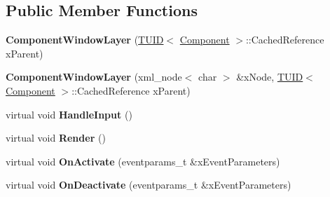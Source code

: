 \subsection*{Public Member Functions}
\begin{DoxyCompactItemize}
\item 
\hypertarget{class_k_g_e_1_1_component_window_layer_adff3a5c837939b6834886eaddd61c8a0}{{\bfseries Component\-Window\-Layer} (\hyperlink{class_k_g_e_1_1_t_u_i_d}{T\-U\-I\-D}$<$ \hyperlink{class_k_g_e_1_1_component}{Component} $>$\-::Cached\-Reference x\-Parent)}\label{class_k_g_e_1_1_component_window_layer_adff3a5c837939b6834886eaddd61c8a0}

\item 
\hypertarget{class_k_g_e_1_1_component_window_layer_a913d14e032d315d2b9c692fed84bd060}{{\bfseries Component\-Window\-Layer} (xml\-\_\-node$<$ char $>$ \&x\-Node, \hyperlink{class_k_g_e_1_1_t_u_i_d}{T\-U\-I\-D}$<$ \hyperlink{class_k_g_e_1_1_component}{Component} $>$\-::Cached\-Reference x\-Parent)}\label{class_k_g_e_1_1_component_window_layer_a913d14e032d315d2b9c692fed84bd060}

\item 
\hypertarget{class_k_g_e_1_1_component_window_layer_ae112cb973520b10f89d56d33f8d21bcb}{virtual void {\bfseries Handle\-Input} ()}\label{class_k_g_e_1_1_component_window_layer_ae112cb973520b10f89d56d33f8d21bcb}

\item 
\hypertarget{class_k_g_e_1_1_component_window_layer_a5947ec5f47c149bf39a122befd470994}{virtual void {\bfseries Render} ()}\label{class_k_g_e_1_1_component_window_layer_a5947ec5f47c149bf39a122befd470994}

\item 
\hypertarget{class_k_g_e_1_1_component_window_layer_aa5d6ce2298b39010a7c158abc86e3037}{virtual void {\bfseries On\-Activate} (eventparams\-\_\-t \&x\-Event\-Parameters)}\label{class_k_g_e_1_1_component_window_layer_aa5d6ce2298b39010a7c158abc86e3037}

\item 
\hypertarget{class_k_g_e_1_1_component_window_layer_a9855c99a112704899a72e3d0976e02b0}{virtual void {\bfseries On\-Deactivate} (eventparams\-\_\-t \&x\-Event\-Parameters)}\label{class_k_g_e_1_1_component_window_layer_a9855c99a112704899a72e3d0976e02b0}

\end{DoxyCompactItemize}
